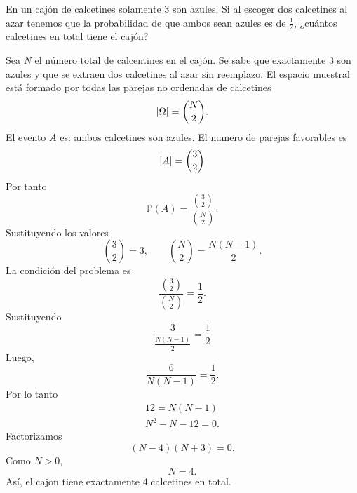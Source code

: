 \message{ !name(tarea2.tex)}\documentclass[12pt,a4paper]{article}
\begin{document}
    \begin{mdframed}[style=mdbluebox,frametitle={Ejercicio 3}]
        En un cajón de calcetines solamente $3$ son azules. Si al escoger dos calcetines al azar 
        tenemos que la probabilidad de que ambos sean azules es de $\frac{1}{2}$, 
        ¿cuántos calcetines en total tiene el cajón?
    \end{mdframed}

    \begin{solucion}
        Sea $N$ el número total de calcentines en el cajón. Se sabe que exactamente 3 son azules y que se extraen
        dos calcetines al azar sin reemplazo. El espacio muestral está formado por todas las parejas no ordenadas
        de calcetines
        \begin{equation*}
            \abs{\Omega}=\binom{N}{2}.
        \end{equation*}
        El evento $A$ es: ambos calcetines son azules. El numero de parejas favorables es
        \begin{equation*}
            \abs{A}=\binom{3}{2}
        \end{equation*}
        Por tanto
        \begin{equation*}
            \mathbb{P}(A)=\frac{\binom{3}{2}}{\binom{N}{2}}.
        \end{equation*}
        Sustituyendo los valores
        \begin{equation*}
            \binom{3}{2}=3, \qquad \binom{N}{2}=\frac{N(N-1)}{2}.
        \end{equation*}
        La condición del problema es
        \begin{equation*}
            \frac{\binom{3}{2}}{\binom{N}{2}}=\frac{1}{2}.
        \end{equation*}
        Sustituyendo
        \begin{equation*}
            \frac{3}{\frac{N(N-1)}{2}}=\frac{1}{2}
        \end{equation*}
        Luego,
        \begin{equation*}
            \frac{6}{N(N-1)}=\frac{1}{2}.
        \end{equation*}
        Por lo tanto
        \begin{align*}
            12=N(N-1)\\
            N^{2}-N-12=0.
        \end{align*}
        Factorizamos 
        \begin{equation*}
            (N-4)(N+3)=0.
        \end{equation*}
        Como $N\gt0$,
        \begin{equation*}
            N=4.
        \end{equation*}
        Así, el cajon tiene exactamente 4 calcetines en total.
    \end{solucion}
\end{document}
